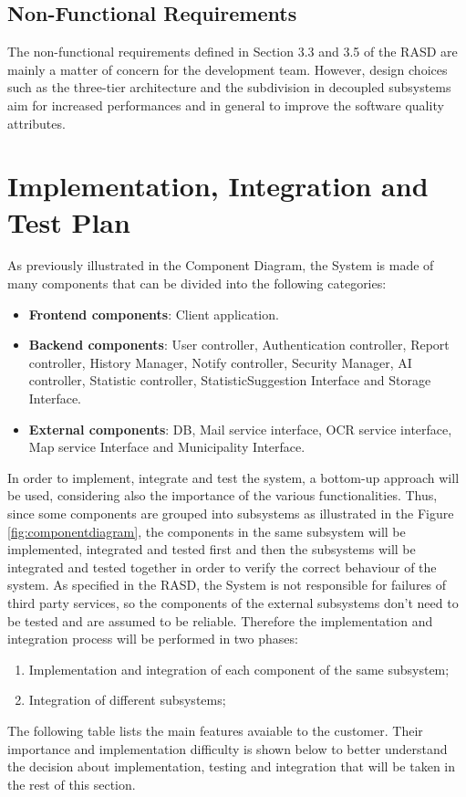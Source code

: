 \documentclass{report}
\begin{document}
\section{Non-Functional Requirements}
The non-functional requirements defined in Section 3.3 and 3.5 of the RASD are mainly a matter of concern for the development team. However, design choices such as the three-tier architecture and the subdivision in decoupled subsystems aim for increased performances and in general to improve the software quality attributes.

\chapter{Implementation, Integration and Test Plan}
As previously illustrated in the Component Diagram, the System is made of many components that can be divided into the following categories:
\begin{itemize}
\item \textbf{Frontend components}: Client application.
\item \textbf{Backend components}: User controller, Authentication controller, Report controller, History Manager, Notify controller, Security Manager, AI controller, Statistic controller, StatisticSuggestion Interface and Storage Interface.
\item \textbf{External components}: DB, Mail service interface, OCR service interface, Map service Interface and Municipality Interface.
\end{itemize}
In order to implement, integrate and test the system, a bottom-up approach will be used, considering also the importance of the various functionalities. Thus, since some components are grouped into subsystems as illustrated in the Figure \ref{fig:componentdiagram}, the components in the same subsystem will be implemented, integrated and tested first and then the subsystems will be integrated and tested together in order to verify the correct behaviour of the system. As specified in the RASD, the System is not responsible for failures of third party services, so the components of the external subsystems don't need to be tested and are assumed to be reliable. Therefore the implementation and integration process will be performed in two phases:
\begin{enumerate}
\item Implementation and integration of each component of the same subsystem;
\item Integration of different subsystems;
\end{enumerate}
The following table lists the main features avaiable to the customer. Their importance and implementation difficulty is shown below to better understand the decision about implementation, testing and integration that will be taken in the rest of this section.
\clearpage
\end{document}
